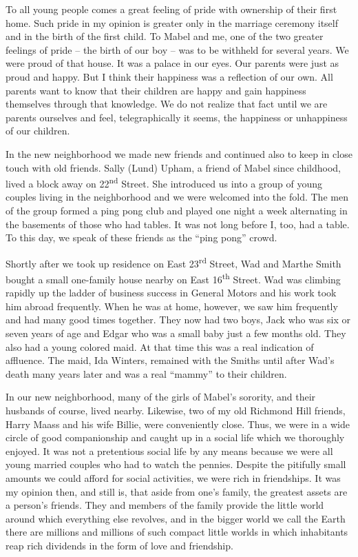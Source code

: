 \documentclass[12pt]{book}              %
\begin{document}
To all young people comes a great feeling of pride with ownership of their first home. Such pride in my opinion is greater only in the marriage ceremony itself and in the birth of the first child. To Mabel and me, one of the two greater feelings of pride -- the birth of our boy -- was to be withheld for several years. We were proud of that house. It was a palace in our eyes. Our parents were just as proud and happy. But I think their happiness was a reflection of our own. All parents want to know that their children are happy and gain happiness themselves through that knowledge. We do not realize that fact until we are parents ourselves and feel, telegraphically it seems, the happiness or unhappiness of our children. 

In the new neighborhood we made new friends and continued also to keep in close touch with old friends. Sally (Lund) Upham, a friend of Mabel since childhood, lived a block away on 22\textsuperscript{nd} Street. She introduced us into a group of young couples living in the neighborhood and we were welcomed into the fold. The men of the group formed a ping pong club and played one night a week alternating in the basements of those who had tables. It was not long before I, too, had a table. To this day, we speak of these friends as the ``ping pong'' crowd.

Shortly after we took up residence on East 23\textsuperscript{rd} Street, Wad and Marthe Smith bought a small one-family house nearby on East 16\textsuperscript{th} Street. Wad was climbing rapidly up the ladder of business success in General Motors and his work took him abroad frequently. When he was at home, however, we saw him frequently and had many good times together. They now had two boys, Jack who was six or seven years of age and Edgar who was a small baby just a few months old. They also had a young colored maid. At that time this was a real indication of affluence. The maid, Ida Winters, remained with the Smiths until after Wad's death many years later and was a real ``mammy'' to their children. 

In our new neighborhood, many of the girls of Mabel's sorority, and their husbands of course, lived nearby. Likewise, two of my old Richmond Hill friends, Harry Maass and his wife Billie, were conveniently close. Thus, we were in a wide circle of good companionship and caught up in a social life which we thoroughly enjoyed. It was not a pretentious social life by any means because we were all young married couples who had to watch the pennies. Despite the pitifully small amounts we could afford for social activities, we were rich in friendships. It was my opinion then, and still is, that aside from one's family, the greatest assets are a person's friends. They and members of the family provide the little world around which everything else revolves, and in the bigger world we call the Earth there are millions and millions of such compact little worlds in which inhabitants reap rich dividends in the form of love and friendship.
\end{document}
